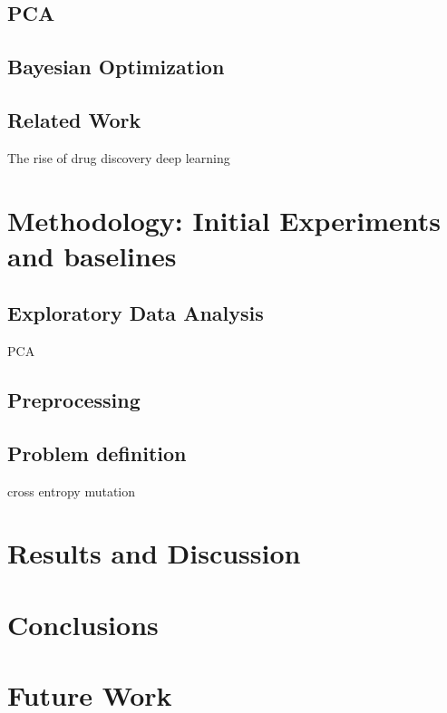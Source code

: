 \documentclass[bsc,frontabs,twoside,singlespacing,parskip,deptreport]{infthesis}     %
\begin{document}
\section{PCA}
\section{Bayesian Optimization}

\section{Related Work}
The rise of drug discovery deep learning
\chapter{Methodology: Initial Experiments and baselines}
\section{Exploratory Data Analysis}
PCA
\section{Preprocessing}
\section{Problem definition}

cross entropy
mutation
\chapter{Results and Discussion}
\chapter{Conclusions}
\chapter{Future Work}



\end{document}

